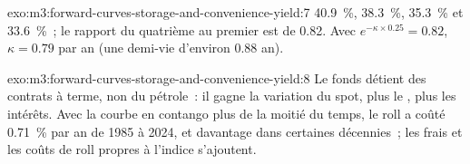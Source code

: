 \begin{solution}{exo:m3:forward-curves-storage-and-convenience-yield:7}
40.9~\%, 38.3~\%, 35.3~\% et 33.6~\%~; le rapport du quatrième au premier est de 0.82. Avec $e^{-\kappa \times
0.25} = 0.82$, $\kappa = 0.79$ par an (une demi-vie d'environ 0.88 an).
\end{solution}

\begin{solution}{exo:m3:forward-curves-storage-and-convenience-yield:8}
Le fonds détient des contrats à terme, non du pétrole~: il gagne la variation du spot, plus le , plus les intérêts. Avec la
courbe en contango plus de la moitié du temps, le roll a coûté 0.71~\% par an de 1985 à 2024, et davantage dans
certaines décennies~; les frais et les coûts de roll propres à l'indice s'ajoutent.
\end{solution}

